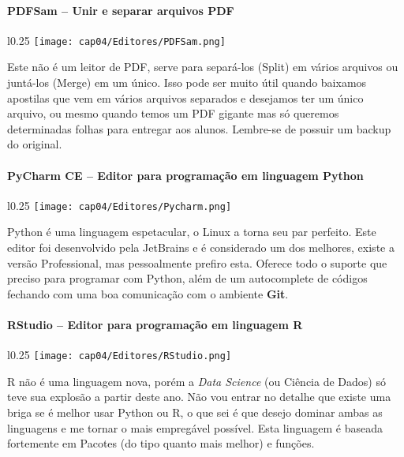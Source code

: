 \paragraph{PDFSam – Unir e separar arquivos PDF}
\begin{minipage}{\linewidth}
 \vspace{5pt}
 \begin{wrapfigure}{l}{0.25\textwidth}
  \vspace{-\baselineskip}
  \texttt{[image: cap04/Editores/PDFSam.png]} 
 \end{wrapfigure}
 Este não é um leitor de PDF, serve para separá-los (Split) em vários arquivos ou juntá-los (Merge) em um único. Isso pode ser muito útil quando baixamos apostilas que vem em vários arquivos separados e desejamos ter um único arquivo, ou mesmo quando temos um PDF gigante mas só queremos determinadas folhas para entregar aos alunos. Lembre-se de possuir um backup do original.
\end{minipage}

\paragraph{PyCharm CE – Editor para programação em linguagem Python}
\begin{minipage}{\linewidth}
 \vspace{5pt}
 \begin{wrapfigure}{l}{0.25\textwidth}
  \vspace{-\baselineskip}
  \texttt{[image: cap04/Editores/Pycharm.png]} 
 \end{wrapfigure}
 Python é uma linguagem espetacular, o Linux a torna seu par perfeito. Este editor foi desenvolvido pela JetBrains e é considerado um dos melhores, existe a versão Professional, mas pessoalmente prefiro esta. Oferece todo o suporte que preciso para programar com Python, além de um autocomplete de códigos fechando com uma boa comunicação com o ambiente \textbf{Git}.
\end{minipage}

\paragraph{RStudio – Editor para programação em linguagem R}
\begin{minipage}{\linewidth}
 \vspace{5pt}
 \begin{wrapfigure}{l}{0.25\textwidth}
  \vspace{-\baselineskip}
  \texttt{[image: cap04/Editores/RStudio.png]} 
 \end{wrapfigure}
 R não é uma linguagem nova, porém a \textit{Data Science} (ou Ciência de Dados) só teve sua explosão a partir deste ano. Não vou entrar no detalhe que existe uma briga se é melhor usar Python ou R, o que sei é que desejo dominar ambas as linguagens e me tornar o mais empregável possível. Esta linguagem é baseada fortemente em Pacotes (do tipo quanto mais melhor) e funções.
\end{minipage}

